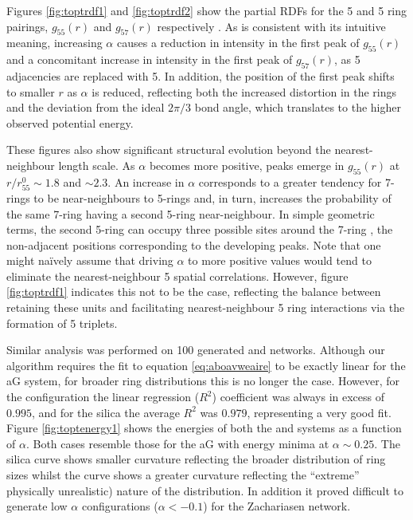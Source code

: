 Figures \ref{fig:toptrdf1} and \ref{fig:toptrdf2} show the partial RDFs for the 5 and 5 ring pairings, $g_{55}\left(r\right)$ and $g_{57}\left(r\right)$ respectively .
As is consistent with its intuitive meaning, increasing $\alpha$ causes a reduction in intensity in the first peak of $g_{55}\left(r\right)$ and a concomitant increase in intensity in the first peak of $g_{57}\left(r\right)$, as 5 adjacencies are replaced with 5. 
In addition, the position of the first peak shifts to smaller $r$ as $\alpha$ is reduced, reflecting both the increased distortion in the rings and the deviation from the ideal $2\pi/3$ bond angle, which translates to the higher observed potential energy.

These figures also show significant structural evolution beyond the nearest-neighbour length scale. 
As $\alpha$ becomes more positive, peaks emerge in $g_{55}\left(r\right)$ at $r/r_{55}^0\sim{1.8}$ and $\sim{2.3}$. 
An increase in $\alpha$ corresponds to a greater tendency for 7\--rings to
be near\--neighbours to 5\--rings and, in turn, increases the probability of the same 7\--ring having a second 5\--ring near\--neighbour. 
In simple geometric terms, the second 5\--ring can occupy three possible sites around the 7\--ring , the non\--adjacent positions corresponding to the developing peaks. 
Note that one might na\"ively assume that driving $\alpha$ to more positive values would tend to eliminate the nearest-neighbour 5 spatial correlations. However, figure \ref{fig:toptrdf1} indicates this not to be the case, reflecting the balance between retaining these units and facilitating nearest\--neighbour 5 ring interactions via the formation of 5 triplets.

Similar analysis was performed on 100 generated \zach{} and \sioii{} networks.
Although our algorithm requires the fit to equation \eqref{eq:aboavweaire} to be exactly linear for the aG system, for broader ring distributions this is no longer the case. 
However, for the \zach{} configuration the linear regression ($R^2$) coefficient was always in excess of $0.995$, and for the silica the average $R^{2}$ was $0.979$, representing a very good fit. 
Figure \ref{fig:toptenergy1} shows the energies of both the \zach{} and \sioii{} systems as a function of $\alpha$. 
Both cases resemble those for the aG with energy minima at $\alpha\sim{0.25}$. The silica curve shows smaller curvature reflecting the broader distribution
of ring sizes whilst the \zach{} curve shows a greater curvature reflecting the ``extreme'' \ie{} physically unrealistic) nature of the distribution.
In addition it proved difficult to generate low $\alpha$ configurations ($\alpha<-0.1$) for the Zachariasen network.


